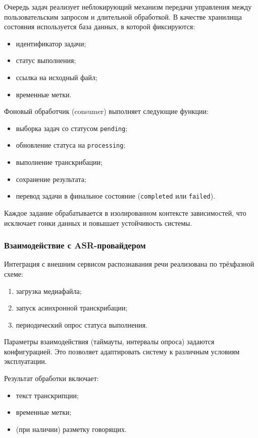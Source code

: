 \documentclass{article}
\begin{document}
Очередь задач реализует неблокирующий механизм передачи управления между пользовательским запросом и длительной обработкой. В качестве хранилища состояния используется база данных, в которой фиксируются:
\begin{itemize}
\item идентификатор задачи;
\item статус выполнения;
\item ссылка на исходный файл;
\item временные метки.
\end{itemize}

Фоновый обработчик (consumer) выполняет следующие функции:
\begin{itemize}
\item выборка задач со статусом \texttt{pending};
\item обновление статуса на \texttt{processing};
\item выполнение транскрибации;
\item сохранение результата;
\item перевод задачи в финальное состояние (\texttt{completed} или \texttt{failed}).
\end{itemize}

Каждое задание обрабатывается в изолированном контексте зависимостей, что исключает гонки данных и повышает устойчивость системы.

\subsubsection{Взаимодействие с ASR-провайдером}

Интеграция с внешним сервисом распознавания речи реализована по трёхфазной схеме:

\begin{enumerate}
\item загрузка медиафайла;
\item запуск асинхронной транскрибации;
\item периодический опрос статуса выполнения.
\end{enumerate}

Параметры взаимодействия (таймауты, интервалы опроса) задаются конфигурацией. Это позволяет адаптировать систему к различным условиям эксплуатации.

Результат обработки включает:
\begin{itemize}
\item текст транскрипции;
\item временные метки;
\item (при наличии) разметку говорящих.
\end{itemize}
\end{document}
